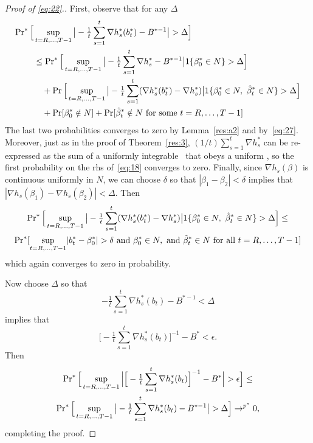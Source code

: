 \documentclass[12pt,fleqn]{article}
\begin{document}
\begin{proof}[Proof of \eqref{eq:22}.]
First, observe that for any $\Delta$
\begin{align}\label{eq:18}
  \operatorname{Pr}^*\Big[&\sup_{t = R,\dots,T-1} \big\lvert - \tfrac{1}{t} \sum_{s=1}^t \nabla h_s^*(b_t^*) - B^{*-1} \big\rvert > \Delta \Big] \\
  &\leq \operatorname{Pr}^*\Big[\sup_{t=R,\dots,T-1} \big\lvert - \tfrac{1}{t} \sum_{s=1}^t \nabla h_s^* - B^{*-1} \big\rvert 1\{\beta_0^* \in N\}> \Delta \Big]\\
  &\quad + \operatorname{Pr}\Big[\sup_{t=R,\dots,T-1} \big\lvert - \tfrac{1}{t} \sum_{s=1}^t (\nabla h_s^*(b_t^*) - \nabla h_s^*) \big\rvert 1\{\beta_0^* \in N,\ \hat \beta_t^* \in N\} > \Delta \Big] \\
  &\quad + \operatorname{Pr}[\beta_0^* \notin N] + \operatorname{Pr}[\hat \beta_t^* \notin N \text{ for some } t = R,\dots,T-1]
\end{align}
The last two probabilities converges to zero by
Lemma~\ref{res:a2} and by~\eqref{eq:27}.  Moreover, just as in the proof of
Theorem~\ref{res:3}, $(1/t) \sum_{s=1}^t \nabla h_s^*$ can
be re-expressed as the sum of a uniformly integrable \mds\ that obeys
a uniform \lln, so the first probability on the rhs of~\eqref{eq:18}
converges to zero. Finally, since $\nabla h_s(\beta)$ is continuous
uniformly in $N$, we can choose $\delta$ so that $|\beta_1 - \beta_2|
< \delta$ implies that $|\nabla h_s(\beta_1) - \nabla h_s(\beta_2)| < \Delta$. Then
\begin{multline*}
  \pr^*\Big[\sup_{t=R,\dots,T-1} \big\lvert - \tfrac{1}{t} \sum_{s=1}^t
  (\nabla h_s^*(b_t^*) - \nabla h_s^*) \big\rvert 1\{\beta_0^* \in N,\ \bh_t^* \in N\} > \Delta \Big]
  \leq \\
  \pr^*[\sup_{t=R,\dots,T-1}  \lvert b_t^* - \btrue^* \rvert > \delta\text{ and }
  \btrue^* \in N,\text{ and } \bh_t^* \in N \text{ for all } t = R,\dots,T-1]
\end{multline*}
which again converges to zero in probability.

Now choose $\Delta$ so that
\begin{equation*}
  - \tfrac{1}{t} \sum_{s=1}^t \nabla h_s^*(b_t) - B^{*-1} < \Delta
\end{equation*}
implies that
\begin{equation*}
\Big[- \tfrac{1}{t} \sum_{s=1}^t \nabla h_s^*(b_t)\Big]^{-1} - B^* < \epsilon.
\end{equation*}
Then
\begin{multline*}
  \operatorname{Pr}^*\Big[\sup_{t=R,\dots,T-1} \Big\lvert\Big[- \tfrac{1}{t} \sum_{s=1}^t
  \nabla h_s^*(b_t)\Big]^{-1} - B^*\Big\rvert > \epsilon\Big] \leq \\
  \operatorname{Pr}^*\Big[\sup_{t=R,\dots,T-1}\big\lvert - \tfrac{1}{t} \sum_{s=1}^t
  \nabla h_s^*(b_t) - B^{*-1}\big\rvert > \Delta\Big]
  \to^{p^*} 0,
\end{multline*}
completing the proof.
\end{proof}
\end{document}
